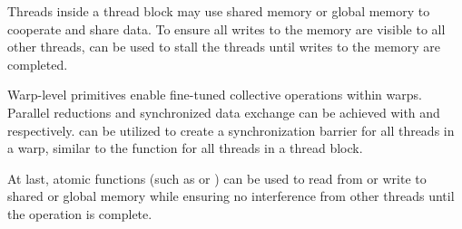 Threads inside a thread block may use shared memory or global memory to cooperate and share data. To ensure all writes to the memory are visible to all other threads,  can be used to stall the threads until writes to the memory are completed.

Warp-level primitives enable fine-tuned collective operations within warps. Parallel reductions and synchronized data exchange can be achieved with  and  respectively.  can be utilized to create a synchronization barrier for all threads in a warp, similar to the function  for all threads in a thread block.

At last, atomic functions (such as  or ) can be used to read from or write to shared or global memory while ensuring no interference from other threads until the operation is complete.